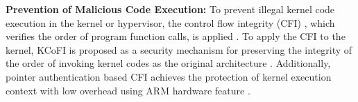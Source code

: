 {\bf Prevention of Malicious Code Execution:}
To prevent illegal kernel code execution in the kernel or hypervisor, the
control flow integrity (CFI) \cite{abadi05ccs, wang10sp, ge16eurosp}, which
verifies the order of program function calls, is applied \cite{cfi-lwn}. 
%
To apply the CFI to the kernel, KCoFI is proposed as a security mechanism for
preserving the integrity of the order of invoking  kernel codes as the original
architecture \cite{criswell14sp}.
%
Additionally, pointer authentication based CFI achieves the protection of kernel
execution context with low overhead using ARM hardware feature
\cite{yoo22usenix}.





